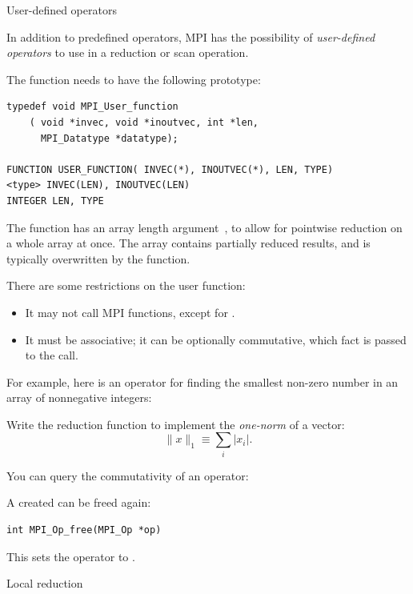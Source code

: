  {User-defined operators}
\label{sec:mpi-op-create}

In addition to predefined operators, MPI has the possibility of
\emph{user-defined operators}
to use in a reduction or scan operation.


The function needs to have the following prototype:

\begin{verbatim}
typedef void MPI_User_function
    ( void *invec, void *inoutvec, int *len, 
      MPI_Datatype *datatype); 

FUNCTION USER_FUNCTION( INVEC(*), INOUTVEC(*), LEN, TYPE) 
<type> INVEC(LEN), INOUTVEC(LEN) 
INTEGER LEN, TYPE 
\end{verbatim}

The function has an array length argument~, to allow for
pointwise reduction on a whole array at once. The  array
contains partially reduced results, and is typically overwritten by
the function.

There are some restrictions on the user function:
\begin{itemize}
\item It may not call MPI functions, except for
  .
\item It must be associative; it can be optionally commutative, which
  fact is passed to the  call.
\end{itemize}

For example, here is an operator for finding the smallest non-zero
number in an array of nonnegative integers:
%

\begin{exercise}
  \label{ex:one-norm-op}
  Write the reduction function to implement the
  \emph{one-norm} of a vector:
  \[ \|x\|_1 \equiv \sum_i |x_i|. \]
\end{exercise}

You can query the commutativity of an operator:
%

A created  can be freed again:
%
\begin{lstlisting}
int MPI_Op_free(MPI_Op *op)
\end{lstlisting}
%
This sets the operator to .

 {Local reduction}

